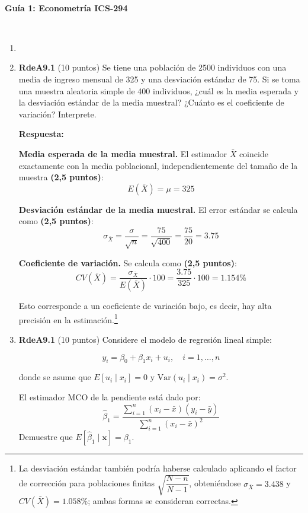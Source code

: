 \documentclass[10pt,a4paper]{article}
\begin{document}
\vspace{5cm}

\begin{center}
\begin{Large}
\textbf{\\Guía 1: Econometría ICS-294}
\end{Large}\\
\end{center}

\begin{enumerate}
    \item 

\item \textbf{RdeA9.1} (10 puntos) 
Se tiene una población de 2500 individuos con una media de ingreso mensual de 325 y una desviación estándar de 75. Si se toma una muestra aleatoria simple de 400 individuos, ¿cuál es la media esperada y la desviación estándar de la media muestral? ¿Cuánto es el coeficiente de variación? Interprete.\\
{\color{blue} \textbf{Respuesta:}

\textbf{Media esperada de la media muestral.} El estimador $\bar X$  coincide exactamente con la media poblacional, independientemente del tamaño de la muestra \textbf{(2,5 puntos)}:
$$E(\bar X) = \mu = 325$$

\textbf{Desviación estándar de la media muestral.} El error estándar se calcula como \textbf{(2,5 puntos)}:
$$\sigma_{\bar X} = \frac{\sigma}{\sqrt{n}} = \frac{75}{\sqrt{400}} = \frac{75}{20} = 3.75$$

\textbf{Coeficiente de variación.} Se calcula como \textbf{(2,5 puntos)}:
$$CV(\bar X) = \frac{\sigma_{\bar X}}{E(\bar X)} \cdot 100 = \frac{3.75}{325}\cdot 100 = 1.154\%$$

Esto corresponde a un coeficiente de variación bajo, es decir, hay alta precisión en la estimación.\footnote{La desviación estándar también podría haberse calculado aplicando el factor de corrección para poblaciones finitas $\sqrt{\dfrac{N-n}{N-1}}$, obteniéndose $\sigma_{\bar X} = 3.438$ y $CV(\bar X)=1.058\%$; ambas formas se consideran correctas.}
}
\item \textbf{RdeA9.1} (10 puntos) 
Considere el modelo de regresión lineal simple:

$$y_i = \beta_0 + \beta_1 x_i + u_i, \quad i = 1, \ldots, n$$

donde se asume que $E[u_i \mid x_i] = 0$ y $\text{Var}(u_i \mid x_i) = \sigma^2$.

El estimador MCO de la pendiente está dado por:
$$\hat{\beta}_1 = \frac{\sum_{i=1}^n (x_i - \bar{x})(y_i - \bar{y})}{\sum_{i=1}^n (x_i - \bar{x})^2}$$
Demuestre que $E[\hat{\beta}_1 \mid \mathbf{x}] = \beta_1$.


\end{enumerate}
\end{document}
